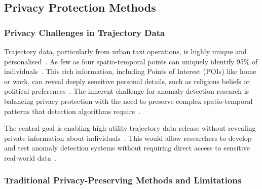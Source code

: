 \documentclass[runningheads]{llncs}
\begin{document}
\subsection{Privacy Protection Methods}
\label{sec:privacy-review}

\subsubsection{Privacy Challenges in Trajectory Data}

Trajectory data, particularly from urban taxi operations, is highly unique and personalised~\cite{primaultLongRoadComputational2019,buchholzReconstructionAttackDifferential2022,maTrajectoryPrivacyProtection2021}. As few as four spatio-temporal points can uniquely identify 95\% of individuals~\cite{primaultLongRoadComputational2019,buchholzReconstructionAttackDifferential2022,maTrajectoryPrivacyProtection2021}. This rich information, including Points of Interest (POIs) like home or work, can reveal deeply sensitive personal details, such as religious beliefs or political preferences~\cite{primaultLongRoadComputational2019,buchholzReconstructionAttackDifferential2022}. The inherent challenge for anomaly detection research is balancing privacy protection with the need to preserve complex spatio-temporal patterns that detection algorithms require~\cite{buchholzSystematisationKnowledgeTrajectory2024,buchholzReconstructionAttackDifferential2022,primaultLongRoadComputational2019,naghizadePrivacyContextawareRelease2020}.

The central goal is enabling high-utility trajectory data release without revealing private information about individuals~\cite{buchholzSystematisationKnowledgeTrajectory2024,raoLSTMTrajGANDeepLearning2020a,liuTrajGANsUsingGenerative2018,jinSurveyExperimentalStudy2023,maTrajectoryPrivacyProtection2021,naghizadePrivacyContextawareRelease2020}. This would allow researchers to develop and test anomaly detection systems without requiring direct access to sensitive real-world data~\cite{buchholzSystematisationKnowledgeTrajectory2024,raoLSTMTrajGANDeepLearning2020a,liuTrajGANsUsingGenerative2018}.

\subsubsection{Traditional Privacy-Preserving Methods and Limitations}
\end{document}
